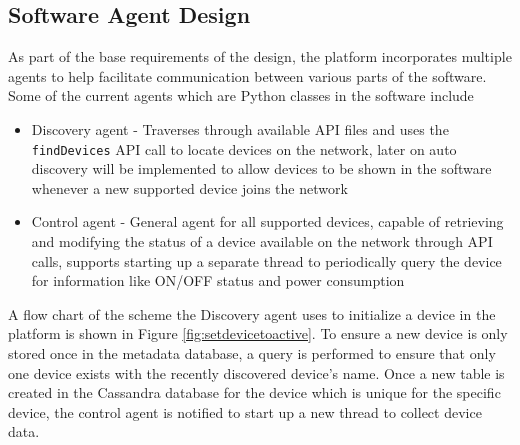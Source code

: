 \documentclass[letterpaper,12pt]{article}   %
\begin{document}
\subsection{Software Agent Design} \label{sec:design}
As part of the base requirements of the design, the platform incorporates multiple agents to help facilitate communication between various parts of the software. Some of the current agents which are Python classes in the software include
\begin{itemize}
    \item Discovery agent - Traverses through available API files and uses the \texttt{findDevices} API call to locate devices on the network, later on auto discovery will be implemented to allow devices to be shown in the software whenever a new supported device joins the network
    \item Control agent - General agent for all supported devices, capable of retrieving and modifying the status of a device available on the network through API calls, supports starting up a separate thread to periodically query the device for information like ON/OFF status and power consumption 
\end{itemize}
A flow chart of the scheme the Discovery agent uses to initialize a device in the platform is shown in Figure \ref{fig:setdevicetoactive}. To ensure a new device is only stored once in the metadata database, a query is performed to ensure that only one device exists with the recently discovered device's name. Once a new table is created in the Cassandra database for the device which is unique for the specific device, the control agent is notified to start up a new thread to collect device data.
\end{document}
